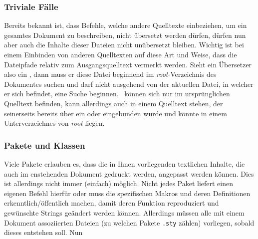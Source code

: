 \subsubsection{Triviale Fälle}%
Bereits bekannt ist, dass Befehle, welche andere Quelltexte einbeziehen, um ein gesamtes Dokument zu beschreiben, nicht übersetzt werden dürfen, dürfen nun aber auch die Inhalte dieser Dateien nicht unübersetzt bleiben.
Wichtig ist bei einem Einbinden von anderen Quelltexten auf diese Art und Weise, dass die Dateipfade relativ zum Ausgangsquelltext vermerkt werden. 
Sieht ein Übersetzer also ein \verb||, dann muss er diese Datei beginnend im \textit{root}-Verzeichnis des Dokumentes suchen und darf nicht ausgehend von der aktuellen Datei, in welcher er sich befindet, eine Suche beginnen.~\verb|| können sich nur im ursprünglichen Quelltext befinden, \verb|| kann allerdings auch in einem Quelltext stehen, der seinerseits bereits über ein \verb|| oder \verb|| eingebunden wurde und könnte in einem Unterverzeichnes von \textit{root} liegen.

\subsubsection{Pakete und Klassen}%
Viele Pakete erlauben es, dass die in Ihnen vorliegenden textlichen Inhalte, die auch im enstehenden Dokument gedruckt werden, angepasst werden können. Dies ist allerdings nicht immer (einfach) möglich. Nicht jedes Paket liefert einen eigenen Befehl hierfür oder muss die spezifischen Makros und deren Definitionen erkenntlich/öffentlich machen, damit deren Funktion reproduziert und gewünschte Strings geändert werden können. Allerdings müssen alle mit einem Dokument assoziierten Dateien (zu welchen Pakete \texttt{.sty} zählen) vorliegen, sobald dieses entstehen soll.
Nun 

